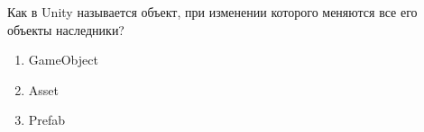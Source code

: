 
Как в Unity называется объект, при изменении которого меняются все его объекты наследники?

\begin{enumerate}
    \item GameObject
    \item Asset
    \item Prefab
\end{enumerate}